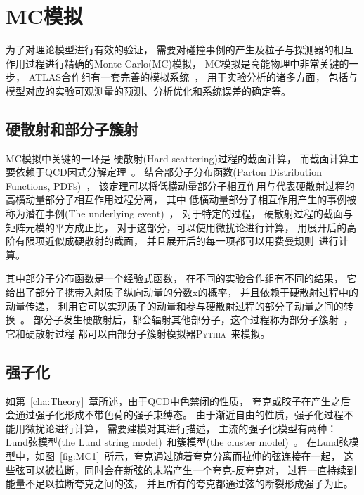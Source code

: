 \section{MC模拟}
\label{sec:Simulation}

为了对理论模型进行有效的验证，
需要对碰撞事例的产生及粒子与探测器的相互作用过程进行精确的Monte Carlo(MC)模拟，
MC模拟是高能物理中非常关键的一步，
ATLAS合作组有一套完善的模拟系统~\cite{ATLASMC}，
用于实验分析的诸多方面，
包括与模型对应的实验可观测量的预测、分析优化和系统误差的确定等。

\subsection{硬散射和部分子簇射}
\label{sec:MCHS}

MC模拟中关键的一环是
硬散射(Hard scattering)过程的截面计算，
而截面计算主要依赖于QCD因式分解定理~\cite{MC1}。
结合部分子分布函数(Parton Distribution Functions, PDFs)~\cite{MC2}，
该定理可以将低横动量部分子相互作用与代表硬散射过程的高横动量部分子相互作用过程分离，
其中
低横动量部分子相互作用产生的事例被称为潜在事例(The underlying event)~\cite{MC3}，
对于特定的过程，
硬散射过程的截面与矩阵元模的平方成正比，
对于这部分，可以使用微扰论进行计算，
用展开后的高阶有限项近似成硬散射的截面，
并且展开后的每一项都可以用费曼规则~\cite{FEYNR}进行计算。

其中部分子分布函数是一个经验式函数，
在不同的实验合作组有不同的结果，
它给出了部分子携带入射质子纵向动量的分数x的概率，
并且依赖于硬散射过程中的动量传递，
利用它可以实现质子的动量和参与硬散射过程的部分子动量之间的转换~\cite{MC1}。
部分子发生硬散射后，都会辐射其他部分子，这个过程称为部分子簇射~\cite{MC6}，
它和硬散射过程
都可以由部分子簇射模拟器\textsc{Pythia}~\cite{MC5}来模拟。


\subsection{强子化}
\label{sec:MCHARD}

如第~\ref{cha:Theory}~章所述，由于QCD中色禁闭的性质，
夸克或胶子在产生之后会通过强子化形成不带色荷的强子束缚态。
由于渐近自由的性质，强子化过程不能用微扰论进行计算，
需要建模对其进行描述，
主流的强子化模型有两种：
Lund弦模型(the Lund string model)~\cite{Hadonization}和簇模型(the cluster model)~\cite{MC4}。
在Lund弦模型中，如图~\ref{fig:MC1}~所示，夸克通过随着夸克分离而拉伸的弦连接在一起，
这些弦可以被拉断，同时会在新弦的末端产生一个夸克-反夸克对，
过程一直持续到能量不足以拉断夸克之间的弦，
并且所有的夸克都通过弦的断裂形成强子为止。

